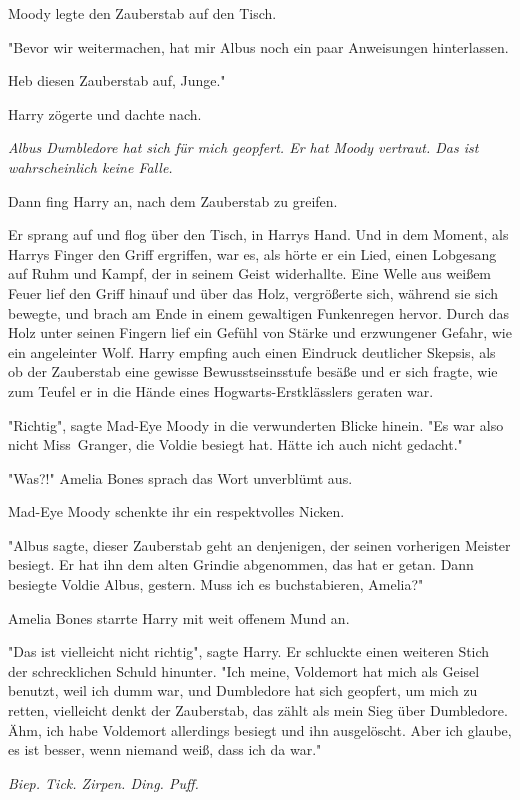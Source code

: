 {Moody legte den Zauberstab auf den Tisch.

"Bevor wir weitermachen, hat mir Albus noch ein paar Anweisungen hinterlassen.

Heb diesen Zauberstab auf, Junge."

Harry zögerte und dachte nach.

\emph{Albus Dumbledore hat sich für mich geopfert. Er hat Moody vertraut. Das ist wahrscheinlich keine Falle.}

Dann fing Harry an, nach dem Zauberstab zu greifen.

Er sprang auf und flog über den Tisch, in Harrys Hand. Und in dem Moment, als Harrys Finger den Griff ergriffen, war es, als hörte er ein Lied, einen Lobgesang auf Ruhm und Kampf, der in seinem Geist widerhallte. Eine Welle aus weißem Feuer lief den Griff hinauf und über das Holz, vergrößerte sich, während sie sich bewegte, und brach am Ende in einem gewaltigen Funkenregen hervor. Durch das Holz unter seinen Fingern lief ein Gefühl von Stärke und erzwungener Gefahr, wie ein angeleinter Wolf. Harry empfing auch einen Eindruck deutlicher Skepsis, als ob der Zauberstab eine gewisse Bewusstseinsstufe besäße und er sich fragte, wie zum Teufel er in die Hände eines Hogwarts-Erstklässlers geraten war.

"Richtig", sagte Mad-Eye Moody in die verwunderten Blicke hinein. "Es war also nicht Miss~Granger, die Voldie besiegt hat. Hätte ich auch nicht gedacht."

"Was?!" Amelia Bones sprach das Wort unverblümt aus.

Mad-Eye Moody schenkte ihr ein respektvolles Nicken.

"Albus sagte, dieser Zauberstab geht an denjenigen, der seinen vorherigen Meister besiegt. Er hat ihn dem alten Grindie abgenommen, das hat er getan. Dann besiegte Voldie Albus, gestern. Muss ich es buchstabieren, Amelia?"

Amelia Bones starrte Harry mit weit offenem Mund an.

"Das ist vielleicht nicht richtig", sagte Harry. Er schluckte einen weiteren Stich der schrecklichen Schuld hinunter. "Ich meine, Voldemort hat mich als Geisel benutzt, weil ich dumm war, und Dumbledore hat sich geopfert, um mich zu retten, vielleicht denkt der Zauberstab, das zählt als mein Sieg über Dumbledore. Ähm, ich habe Voldemort allerdings besiegt und ihn ausgelöscht. Aber ich glaube, es ist besser, wenn niemand weiß, dass ich da war."

\emph{Biep. Tick. Zirpen. Ding. Puff.}

}

